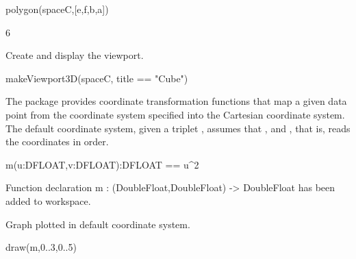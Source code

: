 \begin{xtc}
\begin{xtccomment}
\end{xtccomment}
\begin{spadsrc}
polygon(spaceC,[e,f,b,a]) 
\end{spadsrc}
\begin{TeXOutput}
\begin{fricasmath}{26}
6%
\end{fricasmath}
\end{TeXOutput}
\end{xtc}
\begin{psXtc}
\begin{xtccomment}
Create and display the viewport.
\end{xtccomment}
\begin{spadsrc}
makeViewport3D(spaceC, title == "Cube") 
\end{spadsrc}
\end{psXtc}


The  package provides coordinate transformation
functions that map a given data point from the coordinate system specified
into the Cartesian coordinate system.
The default coordinate system, given a triplet , assumes
that ,  and ,
that is, reads the coordinates in  order.

\begin{xtc}
\begin{xtccomment}
\end{xtccomment}
\begin{spadsrc}
m(u:DFLOAT,v:DFLOAT):DFLOAT == u^2 
\end{spadsrc}
\begin{MessageOutput}
   Function declaration m : (DoubleFloat,DoubleFloat) -> DoubleFloat 
      has been added to workspace.
\end{MessageOutput}
\end{xtc}
%
\begin{psXtc}
\begin{xtccomment}
Graph plotted in default coordinate system.
\end{xtccomment}
\begin{spadsrc}
draw(m,0..3,0..5) 
\end{spadsrc}
\end{psXtc}

